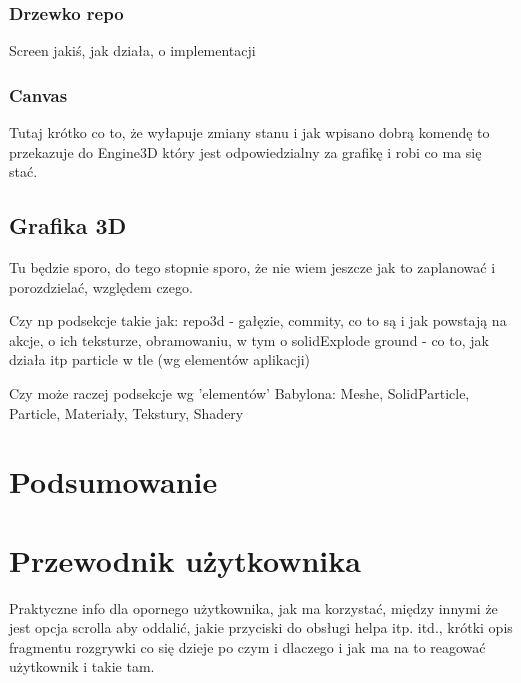 \documentclass[11pt,a4paper,polish,thesis]{dcsbook}
\begin{document}
	\subsection{Drzewko repo}
	
	Screen jakiś, jak działa, o implementacji
	
	\subsection{Canvas}
	
	Tutaj krótko co to, że wyłapuje zmiany stanu i jak wpisano dobrą komendę to przekazuje do Engine3D który jest odpowiedzialny za grafikę i robi co ma się stać.
	
	\section{Grafika 3D}
	Tu będzie sporo, do tego stopnie sporo, że nie wiem jeszcze jak to zaplanować i porozdzielać, względem czego.
	
	Czy np podsekcje takie jak:
	repo3d - gałęzie, commity, co to są i jak powstają na akcje, o ich teksturze, obramowaniu, w tym o solidExplode
	ground - co to, jak działa itp
	particle w tle
	(wg elementów aplikacji)
	
	Czy może raczej podsekcje wg 'elementów' Babylona:
	Meshe, SolidParticle, Particle, Materiały, Tekstury, Shadery
	
	
	\chapter{Podsumowanie}
	
	\appendix
	
	\chapter{Przewodnik użytkownika}
	
	Praktyczne info dla opornego użytkownika, jak ma korzystać, między innymi że jest opcja scrolla aby oddalić, jakie przyciski do obsługi helpa itp. itd., krótki opis fragmentu rozgrywki co się dzieje po czym i dlaczego i jak ma na to reagować użytkownik i takie tam.
	
	\backmatter
	
\end{document}
